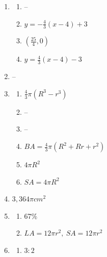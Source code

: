 \documentclass{article}
\begin{document}
\begin{enumerate}
\item

	\begin{enumerate}
	
	\item --
	
	\item $y = -\frac{4}{3} (x - 4) + 3$
	
	\item $\left(\frac{25}{4}, 0 \right)$
	
	\item $y = \frac{4}{3} (x - 4) - 3$
	
	\end{enumerate}
	
\item --

\item

	\begin{enumerate}
	
	\item $\frac{4}{3} \pi (R^3 - r^3)$
	
	\item -- 
	
	\item --
	
	\item $BA = \frac{4}{3} \pi (R^2 + Rr + r^2)$
	
	\item $4 \pi R^2$
	
	\item $SA = 4 \pi R^2$
	
	\end{enumerate}
	
\item $3,364 \pi cm^2$

\item

	\begin{enumerate}
	
	\item 67\%
	
	\item $LA = 12 \pi r^2, \ SA = 12 \pi r^2$
	
	\end{enumerate}
	
\item

	\begin{enumerate}
	
	\item $3:2$
	

\end{enumerate}
\end{enumerate}
\end{document}

